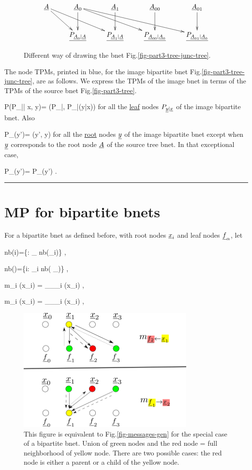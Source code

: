 \begin{figure}[h!]
\centering
$$\xymatrix{
\rvA\ar[dr]\ar[drr]
&\rvA_{0}\ar[d]\ar[drr]\ar[drrr]
&\rvA_{1}\ar[d]
&\rvA_{00}\ar[d]
&\rvA_{01}\ar[d]
\\
&\ul{P_{\rvA_{0}|\rvA}}
&\ul{P_{\rvA_{1}|\rvA}}
&\ul{P_{\rvA_{00}|\rvA_0}}
&\ul{P_{\rvA_{01}|\rvA_0}}
}$$
\caption{
Different
way of drawing 
the bnet Fig.\ref{fig-part3-tree-junc-tree}.}
\label{fig-part3-tree-bip-bnet}
\end{figure}

The node  TPMs, printed in blue,
for the image bipartite bnet 
Fig.\ref{fig-part3-tree-junc-tree},
are as follows. We express the
TPMs of the image bnet
in terms of the 
TPMs of the source bnet 
Fig.\ref{fig-part3-tree}.

\beq\color{blue}
P(P_{\rvy|\rvx}| x, y)=
\delta(P_{\rvy|\rvx}, P_{\rvy|\rvx}(y|x))
\eeq
for all the
\ul{leaf} 
nodes $P_{{\underline{y}}|{\underline{x}}}$ of the
image bipartite bnet.
Also

\beq\color{blue}
P_\rvy(y')= \delta(y', y)
\;
\eeq
for all the \ul{root} nodes ${\underline{y}}$ of the
image bipartite bnet
except when 
${\underline{y}}$ corresponds to
the root node ${\underline{A}}$
of the source tree bnet.
In that exceptional case,

\beq\color{blue}
P_\rvy(y')= P_\rvA(y')
\;.
\eeq


\hrule


\section*{MP for
bipartite bnets}
For
a bipartite 
bnet as defined before,
with
root nodes ${\underline{x}}_i$
and leaf nodes ${\underline{f}}_\alpha$,
let


\beq
nb(i)=\{\alp: \rvf_\alpha\in
nb(\rvx_i)\}
\;,
\eeq

\beq
nb(\alpha)=\{i: \rvx_i\in
nb( \rvf_\alpha)\}
\;,
\eeq

\beq
m_{\alp\larrow i}
(x_i)
=
\pi_{\rvf_\alpha \larrow\rvx_i }
(x_i)
\;,
\eeq

\beq
m_{\alp\rarrow i}
(x_i)
=
\lam_{\rvf_\alp\rarrow \rvx_i}
(x_i)
\;,
\eeq


\begin{figure}[h!]
\centering
\includegraphics[width=3.5in]
{mpass/mpass-messages-bip.png}
\caption{This figure is equivalent to
Fig.\ref{fig-messages-gen}
for the special case of a 
bipartite bnet. Union of green nodes and the red node = full
 neighborhood of yellow node.
There are two possible 
cases:  the
red node is either a parent
or a child  of the yellow 
node.}  
\label{fig-messages-bip}
\end{figure}

